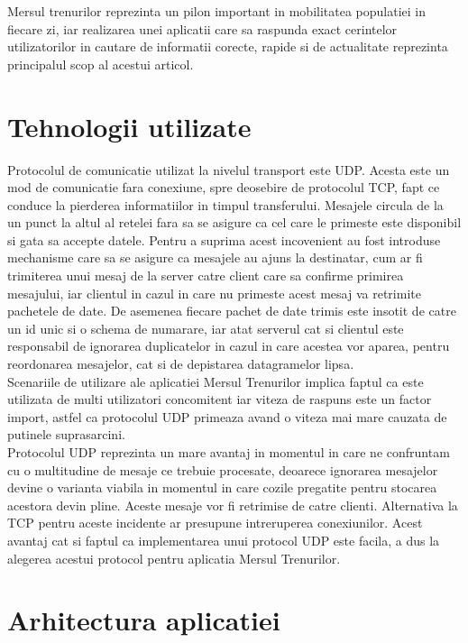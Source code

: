 \documentclass[runningheads]{llncs}
\begin{document}
 Mersul trenurilor reprezinta un pilon important in mobilitatea populatiei in fiecare zi, iar realizarea unei aplicatii care sa raspunda exact cerintelor utilizatorilor in cautare de informatii corecte, rapide si de actualitate reprezinta principalul scop al acestui articol.
\clearpage

\section{Tehnologii utilizate}

\indent Protocolul de comunicatie utilizat la nivelul transport este UDP. Acesta este un mod de comunicatie fara conexiune, spre deosebire de protocolul TCP, fapt ce conduce la pierderea informatiilor in timpul transferului. Mesajele circula de la un punct la altul al retelei fara sa se asigure ca cel care le primeste este disponibil si gata sa accepte datele. Pentru a suprima acest incovenient au fost introduse mechanisme care sa se asigure ca mesajele au ajuns la destinatar, cum ar fi trimiterea unui mesaj de la server catre client care sa confirme primirea mesajului, iar clientul in cazul in care nu primeste acest mesaj va retrimite pachetele de date. De asemenea fiecare pachet de date trimis este insotit de catre un id unic si o schema de numarare, iar atat serverul cat si clientul este responsabil de ignorarea duplicatelor in cazul in care acestea vor aparea, pentru reordonarea mesajelor, cat si de depistarea datagramelor lipsa. \\
\indent Scenariile de utilizare ale aplicatiei Mersul Trenurilor implica faptul ca este utilizata de multi utilizatori concomitent iar viteza de raspuns este un factor import, astfel ca protocolul UDP primeaza avand o viteza mai mare cauzata de putinele suprasarcini.\\
\indent Protocolul UDP reprezinta un mare avantaj in momentul in care ne confruntam cu o multitudine de mesaje ce trebuie procesate, deoarece ignorarea mesajelor devine o varianta viabila in momentul in care cozile pregatite pentru stocarea acestora devin pline. Aceste mesaje vor fi retrimise de catre clienti. Alternativa la TCP pentru aceste incidente ar presupune intreruperea conexiunilor. Acest avantaj cat si faptul ca implementarea unui protocol UDP este facila, a dus la alegerea acestui protocol pentru aplicatia Mersul Trenurilor.


\clearpage

\section{Arhitectura aplicatiei}
\end{document}
